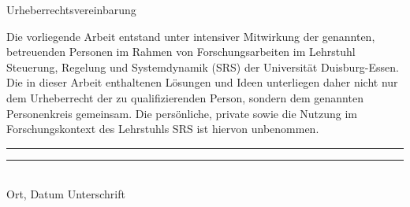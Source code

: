 \vspace*{1cm}
\begin{center}
\large{Urheberrechtsvereinbarung}
\end{center}
\vspace{2cm}
Die vorliegende Arbeit entstand unter intensiver Mitwirkung der genannten, betreuenden Personen im Rahmen von Forschungsarbeiten im Lehrstuhl Steuerung, Regelung und Systemdynamik (SRS) der Universit\"at Duisburg-Essen. Die in dieser Arbeit enthaltenen L\"osungen und Ideen unterliegen daher nicht nur dem Urheberrecht der zu qualifizierenden Person, sondern dem genannten Personenkreis gemeinsam. Die pers\"onliche, private sowie die Nutzung im Forschungskontext des Lehrstuhls SRS ist hiervon unbenommen. 
\newline
\vspace*{3cm}


\noindent\rule{5cm}{0.5pt}\hspace*{6cm}	\noindent\rule{5cm}{0.5pt}\\
\hspace*{1.5cm} Ort, Datum   \hspace*{9cm} 								    Unterschrift 
